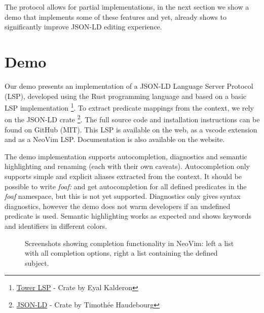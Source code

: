 \documentclass[
]{ceurart}
\begin{document}
The protocol allows for partial implementations, in the next section we show a demo that implements some of these features and yet, already shows to significantly improve JSON-LD editing experience.

\section{Demo}

Our demo presents an implementation of a JSON-LD Language Server Protocol (LSP), developed using the Rust programming language and based on a basic LSP implementation \footnote{\href{https://crates.io/crates/tower-lsp}{Tower LSP} - Crate by Eyal Kalderon}.
To extract predicate mappings from the context, we rely on the JSON-LD crate \footnote{\href{https://crates.io/crates/json-ld}{JSON-LD} - Crate by Timothée Haudebourg}.
The full source code and installation instructions can be found on GitHub (MIT).
This LSP is available on the web, as a vscode extension and as a NeoVim LSP. Documentation is also available on the website. 

The demo implementation supports autocompletion, diagnostics and semantic highlighting and renaming (each with their own caveats). 
Autocompletion only supports simple and explicit aliases extracted from the context. 
It should be possible to write \textit{foaf:} and get autocompletion for all defined predicates in the \textit{foaf} namespace, but this is not yet supported.
Diagnostics only gives syntax diagnostics, however the demo does not warm developers if an undefined predicate is used.
Semantic highlighting works as expected and shows keywords and identifiers in different colors.


\begin{figure}
\centering
{}
\caption{Screenshots showing completion functionality in NeoVim: left a list with all completion options, right a list containing the defined subject.}
\label{fig:complete}
\end{figure}
\end{document}
